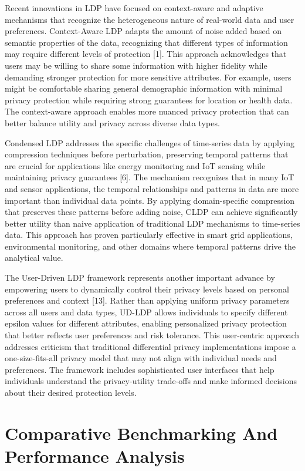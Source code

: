 \documentclass[conference]{IEEEtran}
\begin{document}
Recent innovations in LDP have focused on context-aware and adaptive mechanisms that recognize the heterogeneous nature of real-world data and user preferences. Context-Aware LDP adapts the amount of noise added based on semantic properties of the data, recognizing that different types of information may require different levels of protection [1]. This approach acknowledges that users may be willing to share some information with higher fidelity while demanding stronger protection for more sensitive attributes. For example, users might be comfortable sharing general demographic information with minimal privacy protection while requiring strong guarantees for location or health data. The context-aware approach enables more nuanced privacy protection that can better balance utility and privacy across diverse data types.

Condensed LDP addresses the specific challenges of time-series data by applying compression techniques before perturbation, preserving temporal patterns that are crucial for applications like energy monitoring and IoT sensing while maintaining privacy guarantees [6]. The mechanism recognizes that in many IoT and sensor applications, the temporal relationships and patterns in data are more important than individual data points. By applying domain-specific compression that preserves these patterns before adding noise, CLDP can achieve significantly better utility than naive application of traditional LDP mechanisms to time-series data. This approach has proven particularly effective in smart grid applications, environmental monitoring, and other domains where temporal patterns drive the analytical value.

The User-Driven LDP framework represents another important advance by empowering users to dynamically control their privacy levels based on personal preferences and context [13]. Rather than applying uniform privacy parameters across all users and data types, UD-LDP allows individuals to specify different epsilon values for different attributes, enabling personalized privacy protection that better reflects user preferences and risk tolerance. This user-centric approach addresses criticism that traditional differential privacy implementations impose a one-size-fits-all privacy model that may not align with individual needs and preferences. The framework includes sophisticated user interfaces that help individuals understand the privacy-utility trade-offs and make informed decisions about their desired protection levels.

\section{Comparative Benchmarking And Performance Analysis}
\end{document}
